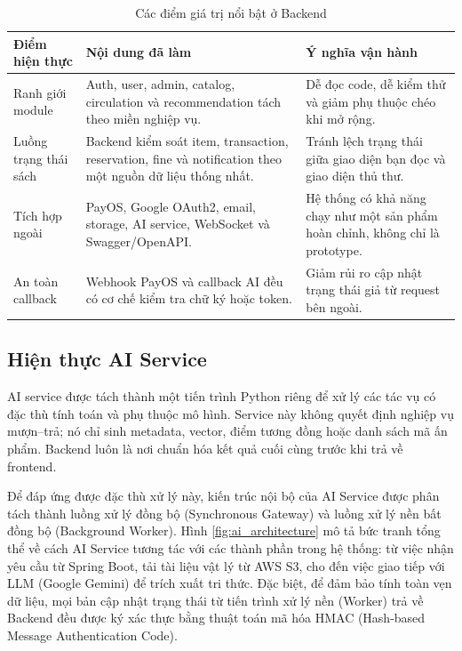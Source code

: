 \begin{table}[H]
\centering
\small
\begin{tabularx}{\textwidth}{|p{3.4cm}|p{5.6cm}|X|}
\hline
\textbf{Điểm hiện thực} & \textbf{Nội dung đã làm} & \textbf{Ý nghĩa vận hành} \\
\hline
Ranh giới module &
Auth, user, admin, catalog, circulation và recommendation tách theo miền nghiệp vụ. &
Dễ đọc code, dễ kiểm thử và giảm phụ thuộc chéo khi mở rộng. \\
\hline
Luồng trạng thái sách &
Backend kiểm soát item, transaction, reservation, fine và notification theo một nguồn dữ liệu thống nhất. &
Tránh lệch trạng thái giữa giao diện bạn đọc và giao diện thủ thư. \\
\hline
Tích hợp ngoài &
PayOS, Google OAuth2, email, storage, AI service, WebSocket và Swagger/OpenAPI. &
Hệ thống có khả năng chạy như một sản phẩm hoàn chỉnh, không chỉ là prototype. \\
\hline
An toàn callback &
Webhook PayOS và callback AI đều có cơ chế kiểm tra chữ ký hoặc token. &
Giảm rủi ro cập nhật trạng thái giả từ request bên ngoài. \\
\hline
\end{tabularx}
\caption{Các điểm giá trị nổi bật ở Backend}
\label{tab:be_value_highlights}
\end{table}

\subsection{Hiện thực AI Service}

AI service được tách thành một tiến trình Python riêng để xử lý các tác vụ có
đặc thù tính toán và phụ thuộc mô hình. Service này không quyết định nghiệp vụ
mượn--trả; nó chỉ sinh metadata, vector, điểm tương đồng hoặc danh sách mã ấn
phẩm. Backend luôn là nơi chuẩn hóa kết quả cuối cùng trước khi trả về frontend.

Để đáp ứng được đặc thù xử lý này, kiến trúc nội bộ của AI Service được phân tách thành luồng xử lý đồng bộ (Synchronous Gateway) và luồng xử lý nền bất đồng bộ (Background Worker). Hình \ref{fig:ai_architecture} mô tả bức tranh tổng thể về cách AI Service tương tác với các thành phần trong hệ thống: từ việc nhận yêu cầu từ Spring Boot, tải tài liệu vật lý từ AWS S3, cho đến việc giao tiếp với LLM (Google Gemini) để trích xuất tri thức. Đặc biệt, để đảm bảo tính toàn vẹn dữ liệu, mọi bản cập nhật trạng thái từ tiến trình xử lý nền (Worker) trả về Backend đều được ký xác thực bằng thuật toán mã hóa HMAC (Hash-based Message Authentication Code).

